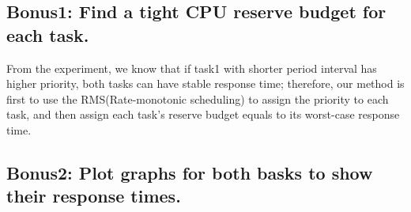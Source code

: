 \documentclass[letterpaper, 12pt]{article}
\begin{document}
\subsection{Bonus1: Find a tight CPU reserve budget for each task.}

From the experiment, we know that if task1 with shorter period interval has higher priority, both tasks can have stable response time; therefore, our method is first to use the RMS(Rate-monotonic scheduling) to assign the priority to each task, and then assign each task's reserve budget equals to its worst-case response time.

\subsection{Bonus2: Plot graphs for both basks to show their response times.}
\end{document}
